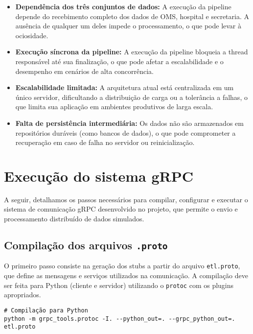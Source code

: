 \documentclass{article}
\begin{document}
\begin{itemize}
    \item \textbf{Dependência dos três conjuntos de dados:} A execução da pipeline depende do recebimento completo dos dados de OMS, hospital e secretaria. A ausência de qualquer um deles impede o processamento, o que pode levar à ociosidade.


    \item \textbf{Execução síncrona da pipeline:} A execução da pipeline bloqueia a thread responsável até sua finalização, o que pode afetar a escalabilidade e o desempenho em cenários de alta concorrência.

    \item \textbf{Escalabilidade limitada:} A arquitetura atual está centralizada em um único servidor, dificultando a distribuição de carga ou a tolerância a falhas, o que limita sua aplicação em ambientes produtivos de larga escala.

    \item \textbf{Falta de persistência intermediária:} Os dados não são armazenados em repositórios duráveis (como bancos de dados), o que pode comprometer a recuperação em caso de falha no servidor ou reinicialização.

\end{itemize}

\section{Execução do sistema gRPC}

A seguir, detalhamos os passos necessários para compilar, configurar e executar o sistema de comunicação gRPC desenvolvido no projeto, que permite o envio e processamento distribuído de dados simulados.

\subsection{Compilação dos arquivos \texttt{.proto}}

O primeiro passo consiste na geração dos stubs a partir do arquivo \texttt{etl.proto}, que define as mensagens e serviços utilizados na comunicação. A compilação deve ser feita para Python (cliente e servidor) utilizando o \texttt{protoc} com os plugins apropriados.

\begin{verbatim}
# Compilação para Python
python -m grpc_tools.protoc -I. --python_out=. --grpc_python_out=. etl.proto

\end{verbatim}
\end{document}
